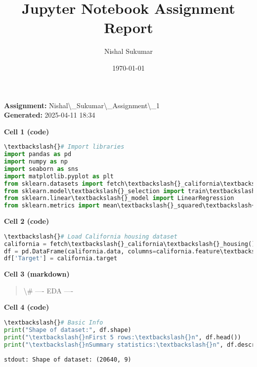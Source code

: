 \documentclass{article}
\begin{document}
\title{Jupyter Notebook Assignment Report}
\author{Nishal Sukumar}
\date{\today}
\maketitle
\begin{center}
\textbf{Assignment:} Nishal\textbackslash{}_Sukumar\textbackslash{}_Assignment\textbackslash{}_1 \\
\textbf{Generated:} 2025-04-11 18:34
\end{center}
\hrulefill
\vspace{1cm}
\vspace{0.5cm}
\noindent\colorbox{gray!20}{\parbox{\textwidth}{
\textbf{Cell 1 (code)}}
\vspace{0.3cm}
\begin{lstlisting}[language=Python]
\textbackslash{}# Import libraries
import pandas as pd
import numpy as np
import seaborn as sns
import matplotlib.pyplot as plt
from sklearn.datasets import fetch\textbackslash{}_california\textbackslash{}_housing
from sklearn.model\textbackslash{}_selection import train\textbackslash{}_test\textbackslash{}_split
from sklearn.linear\textbackslash{}_model import LinearRegression
from sklearn.metrics import mean\textbackslash{}_squared\textbackslash{}_error, r2\textbackslash{}_score
\end{lstlisting}
\vspace{0.5cm}
\noindent\colorbox{gray!20}{\parbox{\textwidth}{
\textbf{Cell 2 (code)}}
\vspace{0.3cm}
\begin{lstlisting}[language=Python]
\textbackslash{}# Load California housing dataset
california = fetch\textbackslash{}_california\textbackslash{}_housing()
df = pd.DataFrame(california.data, columns=california.feature\textbackslash{}_names)
df['Target'] = california.target
\end{lstlisting}
\vspace{0.5cm}
\noindent\colorbox{gray!20}{\parbox{\textwidth}{
\textbf{Cell 3 (markdown)}}
\vspace{0.3cm}
\begin{quote}
\textbackslash{}# ---- EDA ----
\end{quote}
\vspace{0.5cm}
\noindent\colorbox{gray!20}{\parbox{\textwidth}{
\textbf{Cell 4 (code)}}
\vspace{0.3cm}
\begin{lstlisting}[language=Python]
\textbackslash{}# Basic Info
print("Shape of dataset:", df.shape)
print("\textbackslash{}nFirst 5 rows:\textbackslash{}n", df.head())
print("\textbackslash{}nSummary statistics:\textbackslash{}n", df.describe())
\end{lstlisting}
\begin{lstlisting}[backgroundcolor=\color{outputbg}, frame=single]
stdout: Shape of dataset: (20640, 9)


\end{lstlisting}}}}}
\end{document}
